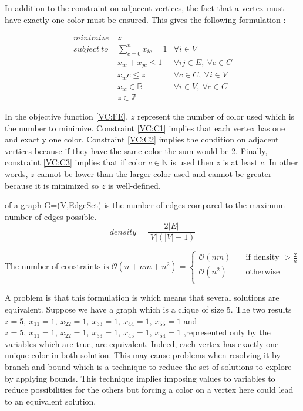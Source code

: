 In addition to the constraint on adjacent vertices, the fact that a vertex must have exactly one color must be ensured. This gives the following formulation :

\begin{eqnarray}
  minimize\ & z & \label{VC:FE} \\
  subject\ to & \displaystyle\sum_{c=0}^{n}{x_{ic}} = 1 & \forall i \in V \label{VC:C1} \\
  &  x_{ic} + x_{jc} \leq 1 & \forall ij \in E,\ \forall c  \in C \label{VC:C2}\\
  &  x_{ic} c \leq z & \forall c  \in C,\ \forall i \in V \label{VC:C3}\\
  &  x_{ic} \in \mathbb{B} &  \forall i \in V,\ \forall c  \in C \label{VC:C4}\\
  &  z \in \mathbb{Z} &
\end{eqnarray}

In the objective function \ref{VC:FE}, $z$ represent the number of color used which is the number to minimize. Constraint \ref{VC:C1} implies that each vertex has one and exactly one color. Constraint \ref{VC:C2} implies the condition on adjacent vertices because if they have the same color the sum would be 2. Finally, constraint \ref{VC:C3} implies that if color $c \in \mathbb{N}$ is used then $z$ is at least $c$. In other words, $z$ cannot be lower than the larger color used and cannot be greater because it is minimized so $z$ is well-defined.

\begin{mydef}
 of a graph G=(V,\gls{EdgeSet}) is the number of edges compared to the maximum number of edges possible.
\[density = \frac{2|E|}{|V|(|V|-1)}\]
\end{mydef}


\[ \text{The  number of constraints is  } \mathcal{O}(n + nm + n^2  ) =
  \begin{cases}
    \mathcal{O}(nm)       & \quad \text{if density } > \frac{2}{n}  \\
    \mathcal{O}(n^2)      & \quad \text{otherwise }\\
  \end{cases}
\]



A problem is that this formulation is  which means that several solutions are equivalent. Suppose we have a graph which is a clique of size 5. The two results $z=5,\ x_{11}=1,\ x_{22}=1,\ x_{33}=1,\ x_{44}=1,\ x_{55}=1$ and  $z=5,\ x_{11}=1,\ x_{22}=1,\ x_{33}=1,\ x_{45}=1,\ x_{54}=1$ ,represented only by the variables which are true, are equivalent. Indeed, each vertex has exactly one unique color in both solution. This may cause problems when resolving it by branch and bound which is a technique to reduce the set of solutions to explore by applying bounds. This technique implies imposing values to variables to reduce possibilities for the others but forcing a color on a vertex here could lead to an equivalent solution.


